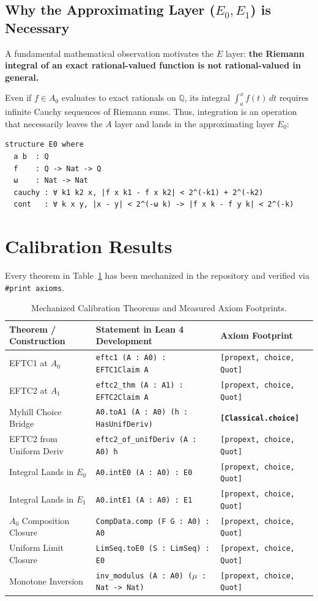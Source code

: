 \documentclass[11pt,a4paper]{article}
\theoremstyle{definition}
\theoremstyle{remark}
\newcommand{\Q}{\ensuremath{\mathbb{Q}}}
\begin{document}
\subsection{Why the Approximating Layer ($E_0, E_1$) is Necessary}
A fundamental mathematical observation motivates the $E$ layer: \textbf{the Riemann integral of an exact rational-valued function is not rational-valued in general.}

Even if $f \in A_0$ evaluates to exact rationals on $\Q$, its integral $\int_a^x f(t) \, dt$ requires infinite Cauchy sequences of Riemann sums. Thus, integration is an operation that necessarily leaves the $A$ layer and lands in the approximating layer $E_0$:
\begin{lstlisting}[language=Lean]
structure E0 where
  a b  : Q
  f    : Q -> Nat -> Q
  ω    : Nat -> Nat
  cauchy : ∀ k1 k2 x, |f x k1 - f x k2| < 2^(-k1) + 2^(-k2)
  cont   : ∀ k x y, |x - y| < 2^(-ω k) -> |f x k - f y k| < 2^(-k)
\end{lstlisting}

\section{Calibration Results}

Every theorem in Table~\ref{tab:calibration} has been mechanized in the repository and verified via \texttt{\#print axioms}.

\begin{table}[htbp]
\centering
\small
\begin{tabular}{lll}
\toprule
\textbf{Theorem / Construction} & \textbf{Statement in Lean 4 Development} & \textbf{Axiom Footprint} \\
\midrule
EFTC1 at $A_0$ & \texttt{eftc1 (A : A0) : EFTC1Claim A} & \texttt{[propext, choice, Quot]} \\
EFTC2 at $A_1$ & \texttt{eftc2\_thm (A : A1) : EFTC2Claim A} & \texttt{[propext, choice, Quot]} \\
Myhill Choice Bridge & \texttt{A0.toA1 (A : A0) (h : HasUnifDeriv)} & \textbf{\texttt{[Classical.choice]}} \\
EFTC2 from Uniform Deriv & \texttt{eftc2\_of\_unifDeriv (A : A0) h} & \texttt{[propext, choice, Quot]} \\
Integral Lands in $E_0$ & \texttt{A0.intE0 (A : A0) : E0} & \texttt{[propext, choice, Quot]} \\
Integral Lands in $E_1$ & \texttt{A0.intE1 (A : A0) : E1} & \texttt{[propext, choice, Quot]} \\
$A_0$ Composition Closure & \texttt{CompData.comp (F G : A0) : A0} & \texttt{[propext, choice, Quot]} \\
Uniform Limit Closure & \texttt{LimSeq.toE0 (S : LimSeq) : E0} & \texttt{[propext, choice, Quot]} \\
Monotone Inversion & \texttt{inv\_modulus (A : A0) ($\mu$ : Nat -> Nat)} & \texttt{[propext, choice, Quot]} \\
\bottomrule
\end{tabular}
\caption{Mechanized Calibration Theorems and Measured Axiom Footprints.}
\label{tab:calibration}
\end{table}
\end{document}
